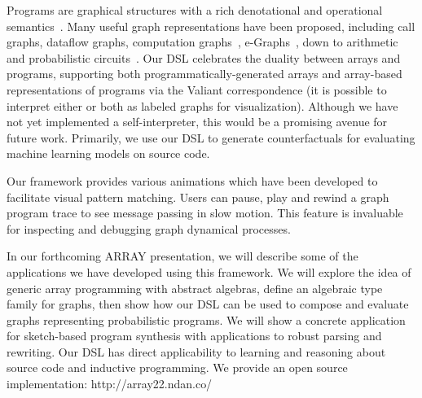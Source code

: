 \documentclass[sigplan,10pt,review,anonymous]{acmart}
\begin{document}
Programs are graphical structures with a rich denotational and operational semantics~\cite{henkel2018code}. Many useful graph representations have been proposed, including call graphs, dataflow graphs, computation graphs~\citep{breuleux2017automatic}, e-Graphs~\citep{willsey2020egg}, down to arithmetic~\citep{miller1988efficient} and probabilistic circuits~\citep{choi2020probabilistic}. Our DSL celebrates the duality between arrays and programs, supporting both programmatically-generated arrays and array-based representations of programs via the Valiant correspondence (it is possible to interpret either or both as labeled graphs for visualization). Although we have not yet implemented a self-interpreter, this would be a promising avenue for future work. Primarily, we use our DSL to generate counterfactuals for evaluating machine learning models on source code.

Our framework provides various animations which have been developed to facilitate visual pattern matching. Users can pause, play and rewind a graph program trace to see message passing in slow motion. This feature is invaluable for inspecting and debugging graph dynamical processes.

In our forthcoming ARRAY presentation, we will describe some of the applications we have developed using this framework. We will explore the idea of generic array programming with abstract algebras, define an algebraic type family for graphs, then show how our DSL can be used to compose and evaluate graphs representing probabilistic programs. We will show a concrete application for sketch-based program synthesis with applications to robust parsing and rewriting. Our DSL has direct applicability to learning and reasoning about source code and inductive programming. We provide an open source implementation: http://array22.ndan.co/







\end{document}
